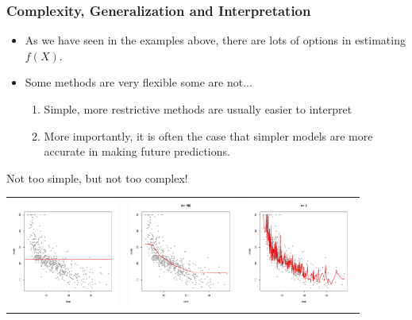 \documentclass[flegn]{beamer}
\begin{document}
\begin{frame}
\frametitle{Complexity, Generalization and Interpretation}
\begin{itemize}
\item As we have seen in the examples above, there are lots of options in estimating $f(X)$. 
\item Some methods are very flexible some are not... {\color{red}{\it why would we ever choose a less flexible model?}}
\begin{enumerate}
\item Simple, more restrictive methods are usually easier to interpret 
\item More importantly, it is often the case that simpler models are {\color{blue}more accurate} in making future predictions.
\end{enumerate}
\end{itemize}


\vspace{-0.1cm}
\begin{center}
{\color{red}Not too simple, but not too complex!}
\end{center}

\vspace{-1cm}
\begin{center}
\begin{tabular}{ccc}
\includegraphics[width=1.4in]{Boston2}&\includegraphics[width=1.4in]{k150}&\includegraphics[width=1.4in]{k2}
\end{tabular}
\end{center}
\end{frame}
\end{document}

